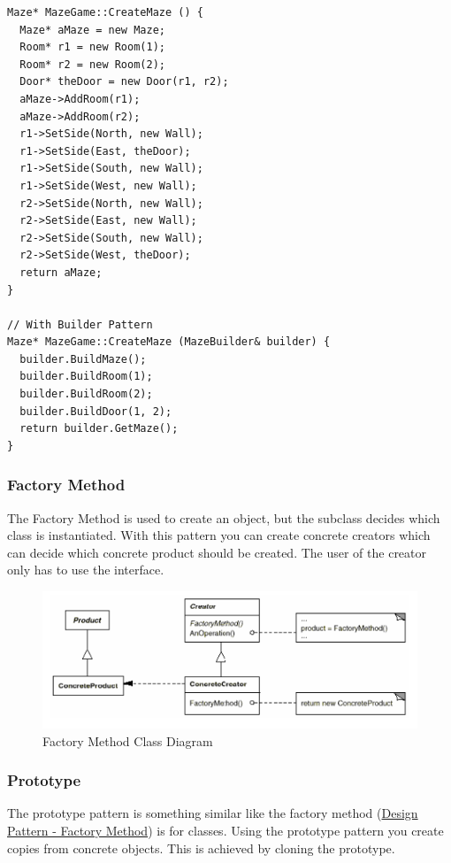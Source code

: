 \documentclass[11pt]{article}
\begin{document}
\begin{lstlisting}
Maze* MazeGame::CreateMaze () {
  Maze* aMaze = new Maze;
  Room* r1 = new Room(1);
  Room* r2 = new Room(2);
  Door* theDoor = new Door(r1, r2);
  aMaze->AddRoom(r1);
  aMaze->AddRoom(r2);
  r1->SetSide(North, new Wall);
  r1->SetSide(East, theDoor);
  r1->SetSide(South, new Wall);
  r1->SetSide(West, new Wall);
  r2->SetSide(North, new Wall);
  r2->SetSide(East, new Wall);
  r2->SetSide(South, new Wall);
  r2->SetSide(West, theDoor);
  return aMaze;
}

// With Builder Pattern
Maze* MazeGame::CreateMaze (MazeBuilder& builder) {
  builder.BuildMaze();
  builder.BuildRoom(1);
  builder.BuildRoom(2);
  builder.BuildDoor(1, 2);
  return builder.GetMaze();
}
\end{lstlisting}
\subsubsection{Factory Method}
\label{sec:org17ea09f}
The Factory Method is used to create an object, but the subclass decides which class is instantiated.
With this pattern you can create concrete creators which can decide which concrete product should be created.
The user of the creator only has to use the interface.


\begin{figure}[htbp]
\centering
\includegraphics[width=.9\linewidth]{img/factory_method.png}
\caption{\label{fig:factory-method-class-diagram}Factory Method Class Diagram}
\end{figure}

\subsubsection{Prototype}
\label{sec:orga4ec4c7}
The prototype pattern is something similar like the factory method (\href{../../../../roam/20220413195351-design_pattern_factory_method.org}{Design Pattern - Factory Method}) is for classes.
Using the prototype pattern you create copies from concrete objects.
This is achieved by cloning the prototype.
\end{document}
